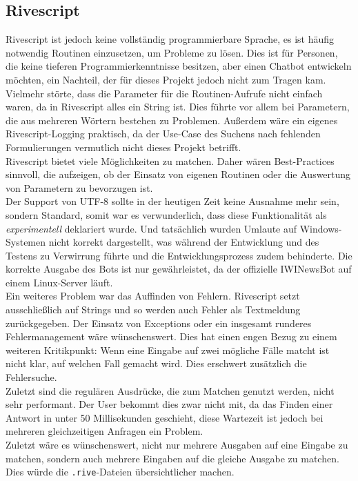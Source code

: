 \subsection{Rivescript}
Rivescript ist jedoch keine vollständig programmierbare Sprache, es ist häufig notwendig Routinen einzusetzen, um Probleme zu lösen. Dies ist für Personen, die keine tieferen Programmierkenntnisse besitzen, aber einen Chatbot entwickeln möchten, ein Nachteil, der für dieses Projekt jedoch nicht zum Tragen kam. Vielmehr störte, dass die Parameter für die Routinen-Aufrufe nicht einfach waren, da in Rivescript alles ein String ist. Dies führte vor allem bei Parametern, die aus mehreren Wörtern bestehen zu Problemen. Außerdem wäre ein eigenes Rivescript-Logging praktisch, da der Use-Case des Suchens nach fehlenden Formulierungen vermutlich nicht dieses Projekt betrifft. \\
Rivescript bietet viele Möglichkeiten zu matchen. Daher wären Best-Practices sinnvoll, die aufzeigen, ob der Einsatz von eigenen Routinen oder die Auswertung von Parametern zu bevorzugen ist.\\
Der Support von UTF-8 sollte in der heutigen Zeit keine Ausnahme mehr sein, sondern Standard, somit war es verwunderlich, dass diese Funktionalität als \emph{experimentell} deklariert wurde. Und tatsächlich wurden Umlaute auf Windows-Systemen nicht korrekt dargestellt, was während der Entwicklung und des Testens zu Verwirrung führte und die Entwicklungsprozess zudem behinderte. Die korrekte Ausgabe des Bots ist nur gewährleistet, da der offizielle IWINewsBot auf einem Linux-Server läuft. \\
Ein weiteres Problem war das Auffinden von Fehlern. Rivescript setzt ausschließlich auf Strings und so werden auch Fehler als Textmeldung zurückgegeben. Der Einsatz von Exceptions oder ein insgesamt runderes Fehlermanagement wäre wünschenswert. Dies hat einen engen Bezug zu einem weiteren Kritikpunkt: Wenn eine Eingabe auf zwei mögliche Fälle matcht ist nicht klar, auf welchen Fall gemacht wird. Dies erschwert zusätzlich die Fehlersuche.\\
Zuletzt sind die regulären Ausdrücke, die zum Matchen genutzt werden, nicht sehr performant. Der User bekommt dies zwar nicht mit, da das Finden einer Antwort in unter 50 Millisekunden geschieht, diese Wartezeit ist jedoch bei mehreren gleichzeitigen Anfragen ein Problem.\\
Zuletzt wäre es wünschenswert, nicht nur mehrere Ausgaben auf eine Eingabe zu matchen, sondern auch mehrere Eingaben auf die gleiche Ausgabe zu matchen. Dies würde die \texttt{.rive}-Dateien übersichtlicher machen.

